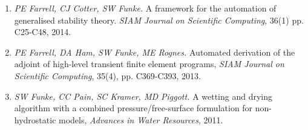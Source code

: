 \documentclass[11pt]{article}
\begin{document}
\begin{enumerate}
\item \textit{PE Farrell, CJ Cotter, SW Funke.} A framework for the automation of generalised stability theory. \textit{SIAM Journal on     Scientific Computing}, 36(1) pp. C25-C48, 2014.
\item \textit{PE Farrell, DA Ham, SW Funke, ME Rognes.} Automated derivation of the adjoint of high-level transient finite element programs, \textit{SIAM Journal on Scientific Computing}, 35(4), pp. C369-C393, 2013.
\item \textit{SW Funke, CC Pain, SC Kramer, MD Piggott.} A wetting and drying algorithm with a combined pressure/free-surface formulation for non-hydrostatic models, \textit{Advances in Water Resources}, 2011.
\end{enumerate}

\end{document}
